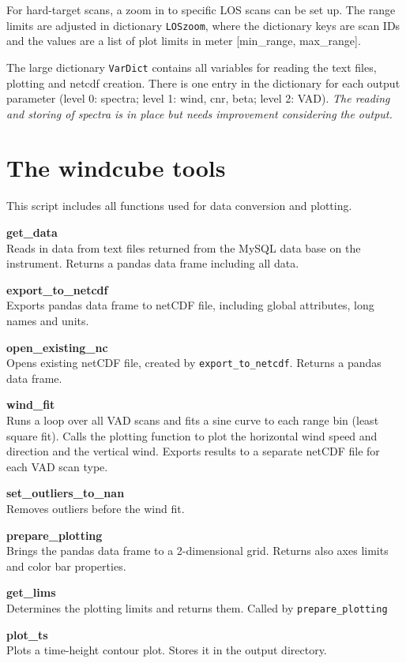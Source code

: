 \documentclass[a4paper]{scrartcl}
\begin{document}
For hard-target scans, a zoom in to specific LOS scans can be set up. The range limits are adjusted in dictionary \verb/LOSzoom/, where the dictionary keys are scan IDs and the values are a list of plot limits in meter [min\_range, max\_range].

The large dictionary \verb/VarDict/ contains all variables for reading the text files, plotting and netcdf creation. There is one entry in the dictionary for each output parameter (level 0: spectra; level 1: wind, cnr, beta; level 2: VAD). \emph{The reading and storing of spectra is in place but needs improvement considering the output.}


\section{The windcube tools}
This script includes all functions used for data conversion and plotting.

\textbf{get\_data}\\
Reads in data from text files returned from the MySQL data base on the instrument. Returns a pandas data frame including all data.

\textbf{export\_to\_netcdf}\\
Exports pandas data frame to netCDF file, including global attributes, long names and units.

\textbf{open\_existing\_nc}\\
Opens existing netCDF file, created by \verb/export_to_netcdf/. Returns a pandas data frame.

\textbf{wind\_fit}\\
Runs a loop over all VAD scans and fits a sine curve to each range bin (least square fit). Calls the plotting function to plot the horizontal wind speed and direction and the vertical wind. Exports results to a separate netCDF file for each VAD scan type.

\textbf{set\_outliers\_to\_nan}\\
Removes outliers before the wind fit.

\textbf{prepare\_plotting}\\
Brings the pandas data frame to a 2-dimensional grid. Returns also axes limits and color bar properties.

\textbf{get\_lims}\\
Determines the plotting limits and returns them. Called by \verb/prepare_plotting/

\textbf{plot\_ts}\\
Plots a time-height contour plot. Stores it in the output directory.
\end{document}

